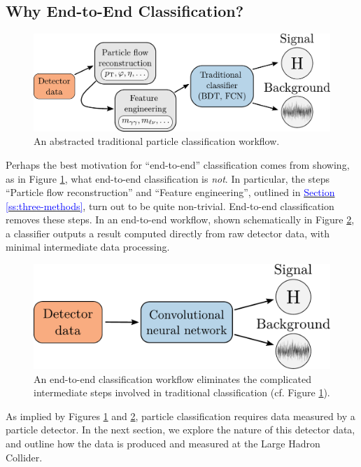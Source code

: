 \documentclass[11pt, a4paper]{article}
\newcommand{\myhref}[2]{\hyperref[#1]{\textcolor{blue}{#2}}}
\begin{document}
\subsection{Why End-to-End Classification?}

\begin{figure}[htb!]
        \centering
        \includegraphics[width=0.8\linewidth]{vector/traditional-pipeline.pdf}
        \caption{An abstracted traditional particle classification workflow.}
        \label{fig:traditional-pipeline}
\end{figure}

Perhaps the best motivation for ``end-to-end'' classification comes from showing, as in Figure \ref{fig:traditional-pipeline}, what end-to-end classification is \textit{not}. In particular, the steps ``Particle flow reconstruction'' and ``Feature engineering'', outlined in \myhref{ss:three-methods}{Section \ref{ss:three-methods}}, turn out to be quite non-trivial. End-to-end classification removes these steps. In an end-to-end workflow, shown schematically in Figure \ref{fig:cnn-pipeline}, a classifier outputs a result computed directly from raw detector data, with minimal intermediate data processing.

\begin{figure}[htb!]
    \centering
    \includegraphics[width=0.70\linewidth]{vector/cnn-pipeline.pdf}
    \caption{An end-to-end classification workflow eliminates the complicated intermediate steps involved in traditional classification (cf. Figure \ref{fig:traditional-pipeline}).}
    \label{fig:cnn-pipeline}
\end{figure}

 As implied by Figures \ref{fig:traditional-pipeline} and \ref{fig:cnn-pipeline}, particle classification requires data measured by a particle detector. In the next section, we explore the nature of this detector data, and outline how the data is produced and measured at the Large Hadron Collider.
\end{document}
